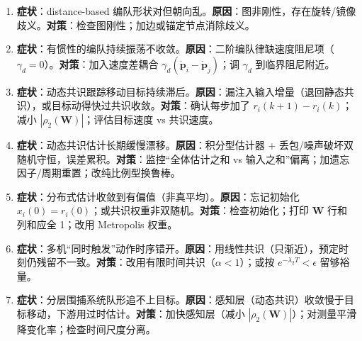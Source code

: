 \begin{enumerate}
  \item \textbf{症状}：distance-based 编队形状对但朝向乱。\textbf{原因}：图非刚性，存在旋转/镜像歧义。\textbf{对策}：检查图刚性；加边或锚定节点消除歧义。
  \item \textbf{症状}：有惯性的编队持续振荡不收敛。\textbf{原因}：二阶编队律缺速度阻尼项（$\gamma_d=0$）。\textbf{对策}：加入速度差耦合 $\gamma_d(\dot{\mathbf{p}}_i-\dot{\mathbf{p}}_j)$；调 $\gamma_d$ 到临界阻尼附近。
  \item \textbf{症状}：动态共识跟踪移动目标持续滞后。\textbf{原因}：漏注入输入增量（退回静态共识），或目标动得快过共识收敛。\textbf{对策}：确认每步加了 $r_i(k{+}1)-r_i(k)$；减小 $|\rho_2(\mathbf{W})|$；评估目标速度 vs 共识速度。
  \item \textbf{症状}：动态共识估计长期缓慢漂移。\textbf{原因}：积分型估计器 + 丢包/噪声破坏双随机守恒，误差累积。\textbf{对策}：监控“全体估计之和 vs 输入之和”偏离；加遗忘因子/周期重置；改纯比例型换鲁棒。
  \item \textbf{症状}：分布式估计收敛到有偏值（非真平均）。\textbf{原因}：忘记初始化 $x_i(0)=r_i(0)$；或共识权重非双随机。\textbf{对策}：检查初始化；打印 $\mathbf{W}$ 行和列和应全 1；改用 Metropolis 权重。
  \item \textbf{症状}：多机“同时触发”动作时序错开。\textbf{原因}：用线性共识（只渐近），预定时刻仍残留不一致。\textbf{对策}：改用有限时间共识（$\alpha<1$）；或按 $e^{-\lambda_2 T}<\epsilon$ 留够裕量。
  \item \textbf{症状}：分层围捕系统队形追不上目标。\textbf{原因}：感知层（动态共识）收敛慢于目标移动，下游用过时估计。\textbf{对策}：加快感知层（减小 $|\rho_2(\mathbf{W})|$）；对测量平滑降变化率；检查时间尺度分离。
\end{enumerate}
